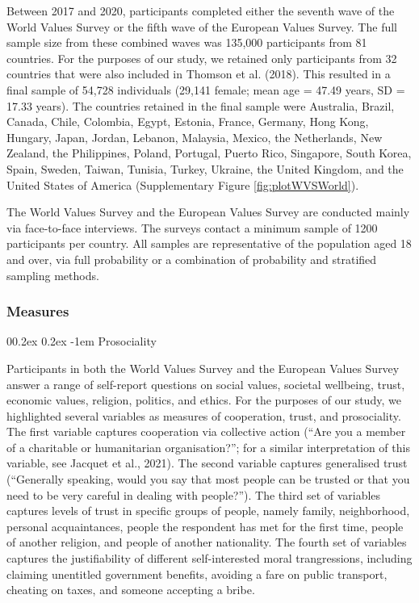 \documentclass[english,man,floatsintext]{apa6}
\makeatletter
\renewcommand{\paragraph}{\@startsection{paragraph}{4}{\parindent}%
  {0\baselineskip \@plus 0.2ex \@minus 0.2ex}%
  {-1em}%
  {\normalfont\normalsize\bfseries\itshape\typesectitle}}
\makeatother
\begin{document}
Between 2017 and 2020, participants completed either the seventh wave of the World Values Survey or the fifth wave of the European Values Survey. The full sample size from these combined waves was 135,000 participants from 81 countries. For the purposes of our study, we retained only participants from 32 countries that were also included in Thomson et al. (2018). This resulted in a final sample of 54,728 individuals (29,141 female; mean age = 47.49 years, SD = 17.33 years). The countries retained in the final sample were Australia, Brazil, Canada, Chile, Colombia, Egypt, Estonia, France, Germany, Hong Kong, Hungary, Japan, Jordan, Lebanon, Malaysia, Mexico, the Netherlands, New Zealand, the Philippines, Poland, Portugal, Puerto Rico, Singapore, South Korea, Spain, Sweden, Taiwan, Tunisia, Turkey, Ukraine, the United Kingdom, and the United States of America (Supplementary Figure \ref{fig:plotWVSWorld}).

The World Values Survey and the European Values Survey are conducted mainly via face-to-face interviews. The surveys contact a minimum sample of 1200 participants per country. All samples are representative of the population aged 18 and over, via full probability or a combination of probability and stratified sampling methods.

\hypertarget{measures-1}{%
\subsubsection{Measures}\label{measures-1}}

\hypertarget{prosociality-1}{%
\paragraph{Prosociality}\label{prosociality-1}}

Participants in both the World Values Survey and the European Values Survey answer a range of self-report questions on social values, societal wellbeing, trust, economic values, religion, politics, and ethics. For the purposes of our study, we highlighted several variables as measures of cooperation, trust, and prosociality. The first variable captures cooperation via collective action (``Are you a member of a charitable or humanitarian organisation?''; for a similar interpretation of this variable, see Jacquet et al., 2021). The second variable captures generalised trust (\enquote{Generally speaking, would you say that most people can be trusted or that you need to be very careful in dealing with people?}). The third set of variables captures levels of trust in specific groups of people, namely family, neighborhood, personal acquaintances, people the respondent has met for the first time, people of another religion, and people of another nationality. The fourth set of variables captures the justifiability of different self-interested moral trangressions, including claiming unentitled government benefits, avoiding a fare on public transport, cheating on taxes, and someone accepting a bribe.
\end{document}

